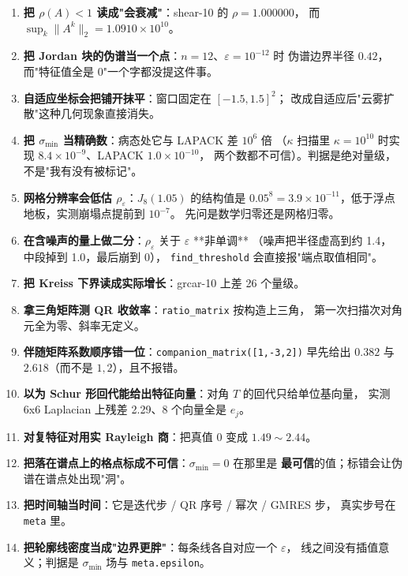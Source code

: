\begin{enumerate}
  \item \textbf{把 $\rho(A)<1$ 读成"会衰减"}：shear-10 的 $\rho=1.000000$，
        而 $\sup_k\|A^k\|_2=1.0910\times10^{10}$。
  \item \textbf{把 Jordan 块的伪谱当一个点}：$n=12$、$\varepsilon=10^{-12}$ 时
        伪谱边界半径 $0.42$，而"特征值全是 0"一个字都没提这件事。
  \item \textbf{自适应坐标会把铺开抹平}：窗口固定在 $[-1.5,1.5]^2$；
        改成自适应后"云雾扩散"这种几何现象直接消失。
  \item \textbf{把 $\sigma_{\min}$ 当精确数}：病态处它与 LAPACK 差 $10^{6}$ 倍
        （$\kappa$ 扫描里 $\kappa=10^{10}$ 时实现 $8.4\times10^{-9}$、LAPACK $1.0\times10^{-10}$，
        两个数都不可信）。判据是绝对量级，不是"我有没有被标记"。
  \item \textbf{网格分辨率会低估 $\rho_\varepsilon$}：$J_8(1.05)$ 的结构值是
        $0.05^{8}=3.9\times10^{-11}$，低于浮点地板，实测崩塌点提前到 $10^{-7}$。
        先问是数学归零还是网格归零。
  \item \textbf{在含噪声的量上做二分}：$\rho_\varepsilon$ 关于 $\varepsilon$ **非单调**
        （噪声把半径虚高到约 1.4，中段掉到 1.0，最后崩到 0），
        \texttt{find\_threshold} 会直接报"端点取值相同"。
  \item \textbf{把 Kreiss 下界读成实际增长}：grcar-10 上差 26 个量级。
  \item \textbf{拿三角矩阵测 QR 收敛率}：\texttt{ratio\_matrix} 按构造上三角，
        第一次扫描次对角元全为零、斜率无定义。
  \item \textbf{伴随矩阵系数顺序错一位}：\texttt{companion\_matrix([1,-3,2])}
        早先给出 $0.382$ 与 $2.618$（而不是 $1,2$），且不报错。
  \item \textbf{以为 Schur 形回代能给出特征向量}：对角 $T$ 的回代只给单位基向量，
        实测 6x6 Laplacian 上残差 2.29、8 个向量全是 $e_j$。
  \item \textbf{对复特征对用实 Rayleigh 商}：把真值 0 变成 $1.49\sim2.44$。
  \item \textbf{把落在谱点上的格点标成不可信}：$\sigma_{\min}=0$ 在那里是
        \textbf{最可信}的值；标错会让伪谱在谱点处出现"洞"。
  \item \textbf{把时间轴当时间}：它是迭代步 / QR 序号 / 幂次 / GMRES 步，
        真实步号在 \texttt{meta} 里。
  \item \textbf{把轮廓线密度当成"边界更胖"}：每条线各自对应一个 $\varepsilon$，
        线之间没有插值意义；判据是 $\sigma_{\min}$ 场与 \texttt{meta.epsilon}。
\end{enumerate}


